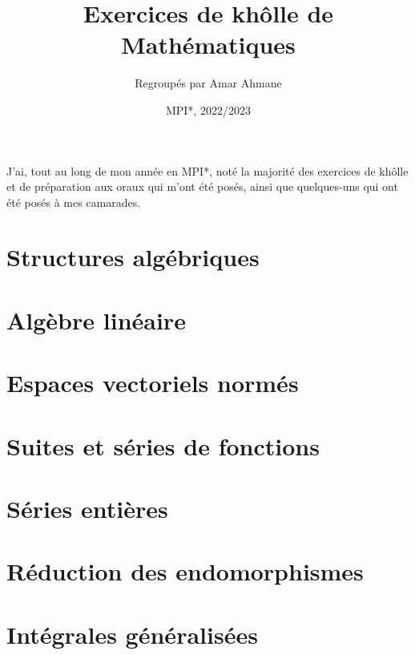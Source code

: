 \documentclass[12pt]{scrartcl}
\title{Exercices de khôlle de Mathématiques}
\author{Regroupés par Amar Ahmane}
\date{MPI*, 2022/2023}
\begin{document}
    \maketitle
    \begin{center}
        \footnotesize J'ai, tout au long de mon année en MPI*, 
        noté la majorité des exercices de khôlle et de préparation aux oraux qui 
        m'ont été posés, ainsi que quelques-uns qui ont été posés à mes camarades.
    \end{center}

    \tableofcontents

    \newpage
    
    \section{Structures algébriques}
    
    \newpage

    \section{Algèbre linéaire}
    
    \newpage

    \section{Espaces vectoriels normés}
    
    \newpage

    \section{Suites et séries de fonctions}
    
    \newpage

    \section{Séries entières}
    
    \newpage

    \section{Réduction des endomorphismes}
    
    \newpage

    \section{Intégrales généralisées}
    
    \newpage
\end{document}
